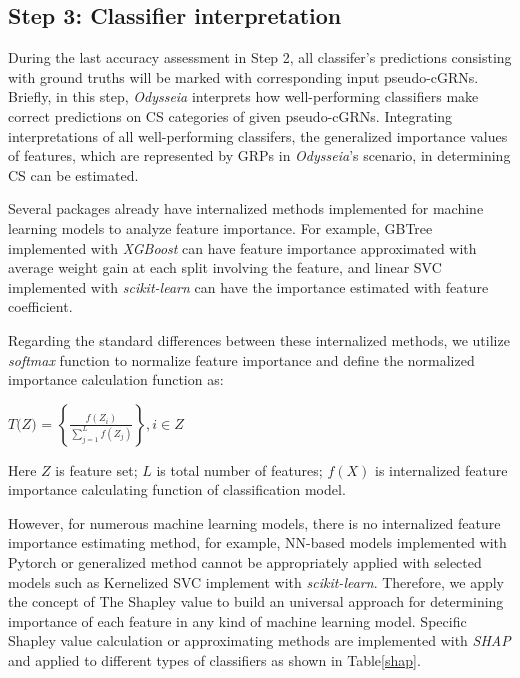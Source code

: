 \documentclass[fleqn,10pt]{wlscirep}
\begin{document}
\subsection*{Step 3: Classifier interpretation}
\label{step3}
During the last accuracy assessment in Step 2, all classifer's predictions consisting with ground truths will be marked with corresponding input pseudo-cGRNs.
Briefly, in this step, \emph{Odysseia} interprets how well-performing classifiers make correct predictions on CS categories of given pseudo-cGRNs.
Integrating interpretations of all well-performing classifers, the generalized importance values of features, which are represented by GRPs in \emph{Odysseia}'s scenario, in determining CS can be estimated.

Several packages already have internalized methods implemented for machine learning models to analyze feature importance.
For example, GBTree implemented with \emph{XGBoost}\cite{chen2016xgboost} can have feature importance approximated with average weight gain at each split involving the feature, and linear SVC implemented with \emph{scikit-learn}\cite{scikit-learn} can have the importance estimated with feature coefficient.

Regarding the standard differences between these internalized methods, we utilize \emph{softmax} function to normalize feature importance and define the normalized importance calculation function as:

\centerline{$\textit{T(Z) = }\left\{\frac{f(Z_i)}{\sum_{j = 1}^{L} f(Z_j)}\right\}, i \in Z$}

\noindent Here $Z$ is feature set; $L$ is total number of features; $f(X)$ is internalized  feature importance calculating function of classification model.\

However, for numerous machine learning models, there is no internalized feature importance estimating method, for example, NN-based models implemented with Pytorch\cite{NEURIPS2019_9015} or generalized method cannot be appropriately applied with selected models such as Kernelized SVC implement with \emph{scikit-learn}\cite{scikit-learn}.
Therefore, we apply the concept of The Shapley value\cite{roth_1988} to build an universal approach for determining importance of each feature in any kind of machine learning model.
Specific Shapley value calculation or approximating methods are implemented with \emph{SHAP}\cite{lundberg2017unified} and applied to different types of classifiers as shown in Table\ref{shap}.
\end{document}
